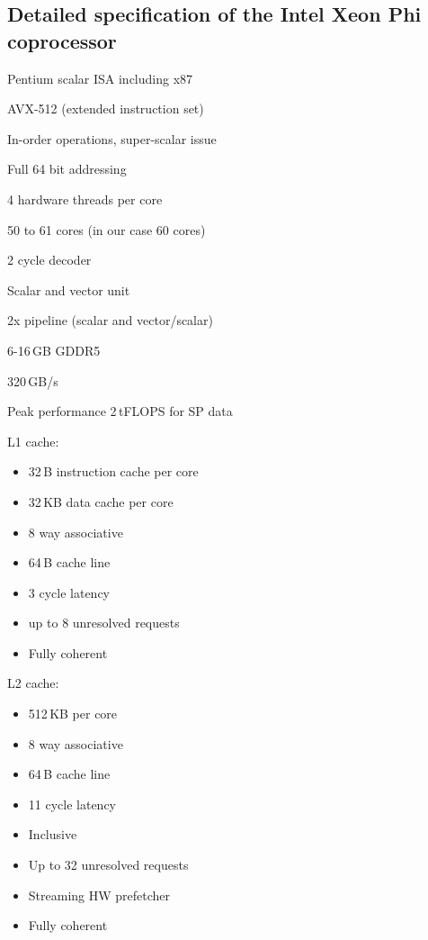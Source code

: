 \subsection{Detailed specification of the Intel Xeon Phi coprocessor}
\begin{itemize}
\item{Pentium scalar ISA including x87 \cite{xeon_phi_book}}
\item{AVX-512 (extended instruction set)}
\item{In-order operations, super-scalar issue}
\item{Full 64 bit addressing}
\item{4 hardware threads per core}
\item{50 to 61 cores (in our case 60 cores)}
\item{2 cycle decoder}
\item{Scalar and vector unit}
\item{2x pipeline (scalar and vector/scalar) 
\item{6-16\,GB GDDR5}
\item{320\,GB/s}
\item{Peak performance 2\,tFLOPS for SP data}
}
\item{L1 cache:
    \begin{itemize}
    \item{32\,B instruction cache per core}
    \item{32\,KB data cache per core}
    \item{8 way associative}
    \item{64\,B cache line}
    \item{3 cycle latency}
    \item{up to 8 unresolved requests}
    \item{Fully coherent }
    \end{itemize}
}
\item{L2 cache:
    \begin{itemize}
    \item{512\,KB per core}
    \item{8 way associative}
    \item{64\,B cache line}
    \item{11 cycle latency}
    \item{Inclusive}
    \item{Up to 32 unresolved requests}
    \item{Streaming HW prefetcher}
    \item{Fully coherent}
    \end{itemize}
}
\end{itemize}

